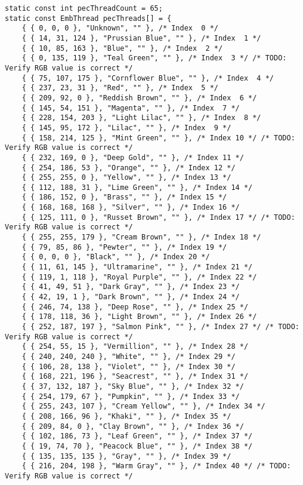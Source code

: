 \documentclass[onesize, a4paper]{refart}
\begin{document}
\begin{verbatim}
static const int pecThreadCount = 65;
static const EmbThread pecThreads[] = {
    { { 0, 0, 0 }, "Unknown", "" }, /* Index  0 */
    { { 14, 31, 124 }, "Prussian Blue", "" }, /* Index  1 */
    { { 10, 85, 163 }, "Blue", "" }, /* Index  2 */
    { { 0, 135, 119 }, "Teal Green", "" }, /* Index  3 */ /* TODO: Verify RGB value is correct */
    { { 75, 107, 175 }, "Cornflower Blue", "" }, /* Index  4 */
    { { 237, 23, 31 }, "Red", "" }, /* Index  5 */
    { { 209, 92, 0 }, "Reddish Brown", "" }, /* Index  6 */
    { { 145, 54, 151 }, "Magenta", "" }, /* Index  7 */
    { { 228, 154, 203 }, "Light Lilac", "" }, /* Index  8 */
    { { 145, 95, 172 }, "Lilac", "" }, /* Index  9 */
    { { 158, 214, 125 }, "Mint Green", "" }, /* Index 10 */ /* TODO: Verify RGB value is correct */
    { { 232, 169, 0 }, "Deep Gold", "" }, /* Index 11 */
    { { 254, 186, 53 }, "Orange", "" }, /* Index 12 */
    { { 255, 255, 0 }, "Yellow", "" }, /* Index 13 */
    { { 112, 188, 31 }, "Lime Green", "" }, /* Index 14 */
    { { 186, 152, 0 }, "Brass", "" }, /* Index 15 */
    { { 168, 168, 168 }, "Silver", "" }, /* Index 16 */
    { { 125, 111, 0 }, "Russet Brown", "" }, /* Index 17 */ /* TODO: Verify RGB value is correct */
    { { 255, 255, 179 }, "Cream Brown", "" }, /* Index 18 */
    { { 79, 85, 86 }, "Pewter", "" }, /* Index 19 */
    { { 0, 0, 0 }, "Black", "" }, /* Index 20 */
    { { 11, 61, 145 }, "Ultramarine", "" }, /* Index 21 */
    { { 119, 1, 118 }, "Royal Purple", "" }, /* Index 22 */
    { { 41, 49, 51 }, "Dark Gray", "" }, /* Index 23 */
    { { 42, 19, 1 }, "Dark Brown", "" }, /* Index 24 */
    { { 246, 74, 138 }, "Deep Rose", "" }, /* Index 25 */
    { { 178, 118, 36 }, "Light Brown", "" }, /* Index 26 */
    { { 252, 187, 197 }, "Salmon Pink", "" }, /* Index 27 */ /* TODO: Verify RGB value is correct */
    { { 254, 55, 15 }, "Vermillion", "" }, /* Index 28 */
    { { 240, 240, 240 }, "White", "" }, /* Index 29 */
    { { 106, 28, 138 }, "Violet", "" }, /* Index 30 */
    { { 168, 221, 196 }, "Seacrest", "" }, /* Index 31 */
    { { 37, 132, 187 }, "Sky Blue", "" }, /* Index 32 */
    { { 254, 179, 67 }, "Pumpkin", "" }, /* Index 33 */
    { { 255, 243, 107 }, "Cream Yellow", "" }, /* Index 34 */
    { { 208, 166, 96 }, "Khaki", "" }, /* Index 35 */
    { { 209, 84, 0 }, "Clay Brown", "" }, /* Index 36 */
    { { 102, 186, 73 }, "Leaf Green", "" }, /* Index 37 */
    { { 19, 74, 70 }, "Peacock Blue", "" }, /* Index 38 */
    { { 135, 135, 135 }, "Gray", "" }, /* Index 39 */
    { { 216, 204, 198 }, "Warm Gray", "" }, /* Index 40 */ /* TODO: Verify RGB value is correct */

\end{verbatim}
\end{document}

